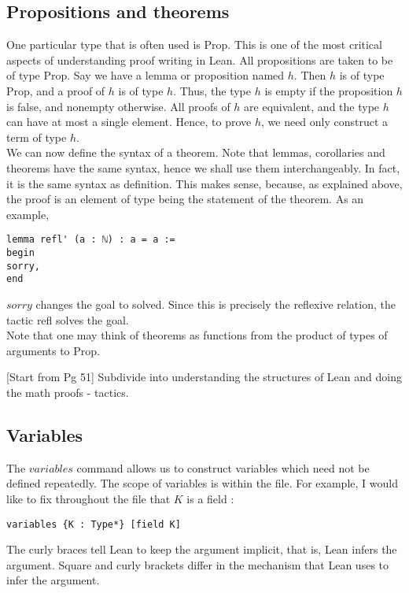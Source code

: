 \documentclass[10pt, a4paper]{article}
\begin{document}
\subsection{Propositions and theorems}
One particular type that is often used is Prop. This is one of the most critical aspects of understanding proof writing in Lean. All propositions are taken to be of type Prop. Say we have a lemma or proposition named $h$. Then $h$ is of type Prop, and a proof of $h$ is of type $h$. Thus, the type $h$ is empty if the proposition $h$ is false, and nonempty otherwise. All proofs of $h$ are equivalent, and the type $h$ can have at most a single element. Hence, to prove $h$, we need only construct a term of type $h$. \\

We can now define the syntax of a theorem. Note that lemmas, corollaries and theorems have the same syntax, hence we shall use them interchangeably. In fact, it is the same syntax as definition. This makes sense, because, as explained above, the proof is an element of type being the statement of the theorem. As an example,

\begin{lstlisting}
lemma refl' (a : ℕ) : a = a :=
begin
sorry,
end
\end{lstlisting}

$sorry$ changes the goal to solved. Since this is precisely the reflexive relation, the tactic refl solves the goal.\\

Note that one may think of theorems as functions from the product of types of arguments to Prop.

[Start from Pg 51] Subdivide into understanding the structures of Lean and doing the math proofs - tactics.

\subsection{Variables}

The $variables$ command allows us to construct variables which need not be defined repeatedly. The scope of variables is within the file. For example, I would like to fix throughout the file that $K$ is a field : 

\begin{lstlisting}
variables {K : Type*} [field K]
\end{lstlisting}

The curly braces tell Lean to keep the argument implicit, that is, Lean infers the argument. Square and curly brackets differ in the mechanism that Lean uses to infer the argument. \\
\end{document}
